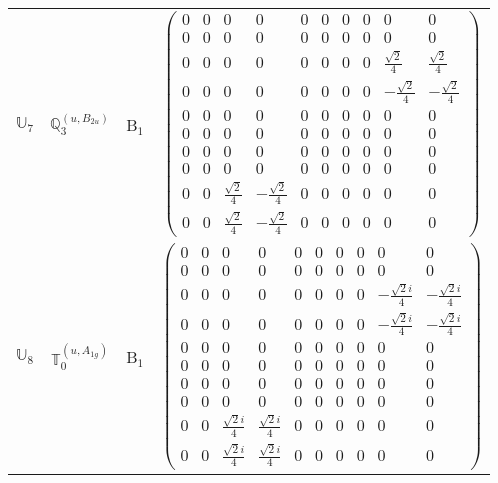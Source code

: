 \documentclass[fleqn,10pt,landscape]{article}
\begin{document}
\begin{itemize}
\begin{center}
\begin{longtable}{c|c|c|c}
$ \mathbb{U}_{7} $ & $\mathbb{Q}_{3}^{(u,B_{2u})}$ & B$_{1}$ & $\begin{pmatrix} 0 & 0 & 0 & 0 & 0 & 0 & 0 & 0 & 0 & 0 \\ 0 & 0 & 0 & 0 & 0 & 0 & 0 & 0 & 0 & 0 \\ 0 & 0 & 0 & 0 & 0 & 0 & 0 & 0 & \frac{\sqrt{2}}{4} & \frac{\sqrt{2}}{4} \\ 0 & 0 & 0 & 0 & 0 & 0 & 0 & 0 & - \frac{\sqrt{2}}{4} & - \frac{\sqrt{2}}{4} \\ 0 & 0 & 0 & 0 & 0 & 0 & 0 & 0 & 0 & 0 \\ 0 & 0 & 0 & 0 & 0 & 0 & 0 & 0 & 0 & 0 \\ 0 & 0 & 0 & 0 & 0 & 0 & 0 & 0 & 0 & 0 \\ 0 & 0 & 0 & 0 & 0 & 0 & 0 & 0 & 0 & 0 \\ 0 & 0 & \frac{\sqrt{2}}{4} & - \frac{\sqrt{2}}{4} & 0 & 0 & 0 & 0 & 0 & 0 \\ 0 & 0 & \frac{\sqrt{2}}{4} & - \frac{\sqrt{2}}{4} & 0 & 0 & 0 & 0 & 0 & 0 \end{pmatrix}$ \\
$ \mathbb{U}_{8} $ & $\mathbb{T}_{0}^{(u,A_{1g})}$ & B$_{1}$ & $\begin{pmatrix} 0 & 0 & 0 & 0 & 0 & 0 & 0 & 0 & 0 & 0 \\ 0 & 0 & 0 & 0 & 0 & 0 & 0 & 0 & 0 & 0 \\ 0 & 0 & 0 & 0 & 0 & 0 & 0 & 0 & - \frac{\sqrt{2} i}{4} & - \frac{\sqrt{2} i}{4} \\ 0 & 0 & 0 & 0 & 0 & 0 & 0 & 0 & - \frac{\sqrt{2} i}{4} & - \frac{\sqrt{2} i}{4} \\ 0 & 0 & 0 & 0 & 0 & 0 & 0 & 0 & 0 & 0 \\ 0 & 0 & 0 & 0 & 0 & 0 & 0 & 0 & 0 & 0 \\ 0 & 0 & 0 & 0 & 0 & 0 & 0 & 0 & 0 & 0 \\ 0 & 0 & 0 & 0 & 0 & 0 & 0 & 0 & 0 & 0 \\ 0 & 0 & \frac{\sqrt{2} i}{4} & \frac{\sqrt{2} i}{4} & 0 & 0 & 0 & 0 & 0 & 0 \\ 0 & 0 & \frac{\sqrt{2} i}{4} & \frac{\sqrt{2} i}{4} & 0 & 0 & 0 & 0 & 0 & 0 \end{pmatrix}$ \\

\end{longtable}
\end{center}
\end{itemize}
\end{document}
